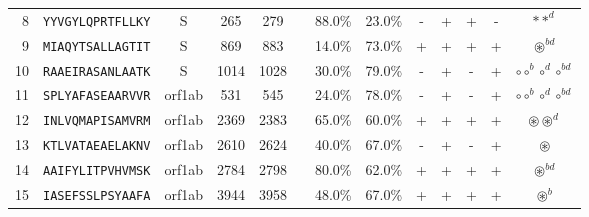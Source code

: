 \begin{tabular}{rcccccccccccc}
8  &  \texttt{YYVGYLQPRTFLLKY} &       S &    265 &   279 &                &                          88.0\% &                           23.0\% &          - &           + &          + &           - &                                                                        $ \ast \ast^d $ \\
9  &  \texttt{MIAQYTSALLAGTIT} &       S &    869 &   883 &                &                          14.0\% &                           73.0\% &          + &           + &          + &           + &                                                                   $ \circledast^{bd} $ \\
10 &  \texttt{RAAEIRASANLAATK} &       S &   1014 &  1028 &                &                          30.0\% &                           79.0\% &          - &           + &          - &           + &                                                   $ \circ \circ^b \circ^d \circ^{bd} $ \\
11 &  \texttt{SPLYAFASEAARVVR} &  orf1ab &    531 &   545 &                &                          24.0\% &                           78.0\% &          - &           + &          - &           + &                                                   $ \circ \circ^b \circ^d \circ^{bd} $ \\
12 &  \texttt{INLVQMAPISAMVRM} &  orf1ab &   2369 &  2383 &                &                          65.0\% &                           60.0\% &          + &           + &          + &           + &                                                          $ \circledast \circledast^d $ \\
13 &  \texttt{KTLVATAEAELAKNV} &  orf1ab &   2610 &  2624 &                &                          40.0\% &                           67.0\% &          - &           + &          - &           + &                                                                        $ \circledast $ \\
14 &  \texttt{AAIFYLITPVHVMSK} &  orf1ab &   2784 &  2798 &                &                          80.0\% &                           62.0\% &          + &           + &          + &           + &                                                                   $ \circledast^{bd} $ \\
15 &  \texttt{IASEFSSLPSYAAFA} &  orf1ab &   3944 &  3958 &                &                          48.0\% &                           67.0\% &          + &           + &          + &           + &                                                                      $ \circledast^b $ \\

\end{tabular}
